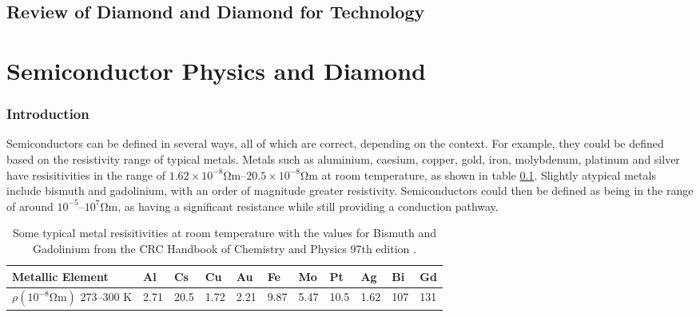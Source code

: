 

\chapter{Review of Diamond and Diamond for Technology} %

\label{ch:review_of_diamond} %

\part{Semiconductor Physics and Diamond}
\section{Introduction}

Semiconductors can be defined in several ways, all of which are correct, depending on the context. For example, they could be defined based on the resistivity range of typical metals. Metals such as aluminium, caesium, copper, gold, iron, molybdenum, platinum and silver have resisitivities in the range of $1.62\times10^{-8}\si{\ohm\metre}\text{--}20.5\times10^{-8}\si{\ohm\metre}$ at room temperature, as shown in table \ref{tab:metal_resisitivities}. Slightly atypical metals include bismuth and gadolinium, with an order of magnitude greater resistivity. Semiconductors could then be defined as being in the range of around $10^{-5}\text{--}10^{7}\si{\ohm\metre}$, as having a significant resistance while still providing a conduction pathway.

\begin{table}
\begin{tabular}{|l|l|l|l|l|l|l|l|l|l|l|}
\hline
Metallic Element            & Al   & Cs   & Cu   & Au   & Fe   & Mo   & Pt   & Ag   & Bi  & Gd  \\ \hline
$\rho \left(10^{-8}\si{\ohm\metre}\right)$ 273--300 K & 2.71 & 20.5 & 1.72 & 2.21 & 9.87 & 5.47 & 10.5 & 1.62 & 107 & 131 \\ \hline
\end{tabular}
\caption{Some typical metal resisitivities at room temperature with the values for Bismuth and Gadolinium from the CRC Handbook of Chemistry and Physics 97th edition \cite{haynes:2017}.}
\label{tab:metal_resisitivities}
\end{table}

